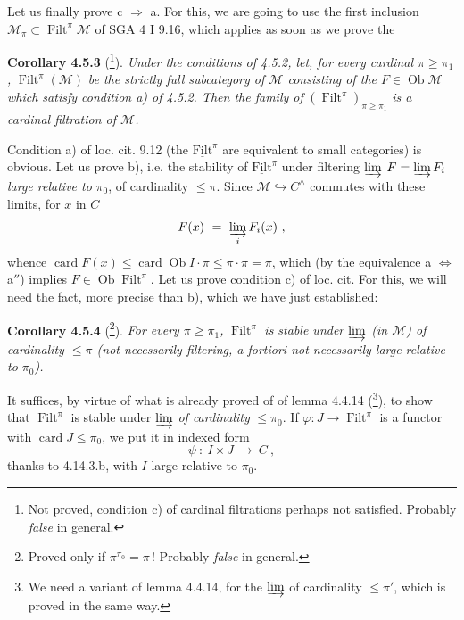 \documentclass[11pt]{article}
\newcommand{\printedpage}[1]{\marginpar{\footnotesize p.~#1}}
\newcommand{\msp}[1]{\marginpar{\footnotesize [#1]}}
\newcommand{\card}{\operatorname{card}}
\newcommand{\Ob}{\operatorname{Ob}}
\newcommand{\Filt}{\operatorname{Filt}}
\newcommand{\uFilt}{\underline{\mathrm{Filt}}}
\begin{document}
Let us finally prove c $\Longrightarrow$ a. For this, we are going to use the first inclusion $\mathcal{M}_{\pi} \subset \Filt^{\pi}\mathcal{M}$ of SGA 4 I 9.16, which applies as soon as we prove the

\textbf{Corollary 4.5.3} (\footnote{Not proved, condition c) of cardinal filtrations perhaps not satisfied. Probably \textit{false} in general.}). \textit{Under the conditions of 4.5.2, let, for every cardinal $\pi \geqslant \pi_1$,} $\Filt^{\pi}(\mathcal{M})$ \textit{be the strictly full subcategory of $\mathcal{M}$ consisting of the $F \in \Ob\mathcal{M}$ which satisfy condition a) of 4.5.2. Then the family of} $(\Filt^{\pi})_{\pi\geqslant\pi_1}$ \textit{is a}
\msp{page 110}
\textit{cardinal filtration of $\mathcal{M}$.}

Condition a) of loc. cit. 9.12 (the $\uFilt^{\pi}$ are equivalent to small categories) is obvious. Let us prove b), i.e. the stability of $\uFilt^{\pi}$ under filtering $\varinjlim$ $F = \varinjlim F_i$ \textit{large relative to} $\pi_0$, of cardinality $\leqslant \pi$. Since $\mathcal{M} \hookrightarrow C^{\wedge}$ commutes with these limits, for $x$ in $C$
\[
F(x) \ =\ \varinjlim_{i} F_i(x)\ ,
\]
\printedpage{31}
whence $\card F(x) \leqslant \card\Ob I \cdot \pi \leqslant \pi \cdot \pi = \pi$, which (by the equivalence a $\Longleftrightarrow$ a$''$) implies $F \in \Ob\Filt^{\pi}$. Let us prove condition c) of loc. cit. For this, we will need the fact, more precise than b), which we have just established:

\textbf{Corollary 4.5.4} (\footnote{Proved only if $\pi^{\pi_0} = \pi$\,! Probably \textit{false} in general.}). \textit{For every $\pi \geqslant \pi_1$,} $\Filt^{\pi}$ \textit{is stable under $\varinjlim$ (in $\mathcal{M}$) of cardinality $\leqslant \pi$ (not necessarily filtering, a fortiori not necessarily large relative to $\pi_0$).}

It suffices, by virtue of what is already proved of of lemma 4.4.14 (\footnote{We need a variant of lemma 4.4.14, for the $\varinjlim$ of cardinality $\leqslant \pi'$, which is proved in the same way.}), to show that $\Filt^{\pi}$ %
is stable under $\varinjlim$ \textit{of cardinality} $\leqslant \pi_0$. If $\varphi : J \longrightarrow \Filt^{\pi}$ is a functor with $\card J \leqslant \pi_0$, we put it in indexed form
\[
\psi\ :\ I \times J \ \longrightarrow\ C\ ,
\]
thanks to 4.14.3.b, with $I$ large relative to $\pi_0$.
\end{document}
